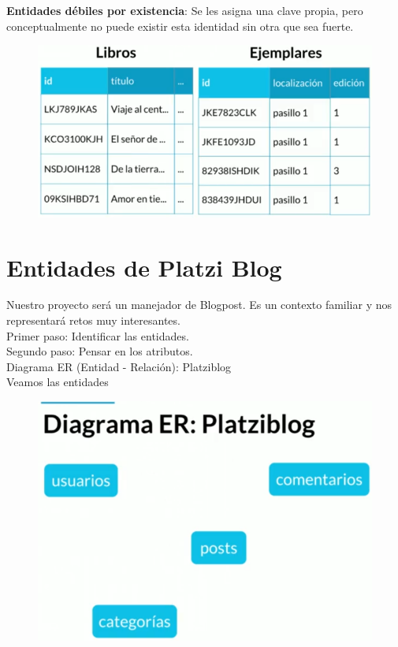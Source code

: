 \documentclass{article}
\begin{document}
\textbf{Entidades débiles por existencia}: Se les asigna una clave propia,
pero conceptualmente no puede existir esta identidad sin otra que sea fuerte.

\begin{figure}[h!]
    \centering
      \includegraphics[scale=0.5]{./Pictures/007_enditad_debil_existencia.png}
\end{figure}


\section{Entidades de Platzi Blog}%
Nuestro proyecto será un manejador de Blogpost. Es un contexto familiar y nos
representará retos muy interesantes.\\

Primer paso: Identificar las entidades.\\
Segundo paso: Pensar en los atributos.\\

Diagrama ER (Entidad - Relación): Platziblog\\

Veamos las entidades
\begin{figure}[h!]
    \centering
      \includegraphics[scale=0.45]{./Pictures/008_Diagrama.png}
\end{figure}
\end{document}
